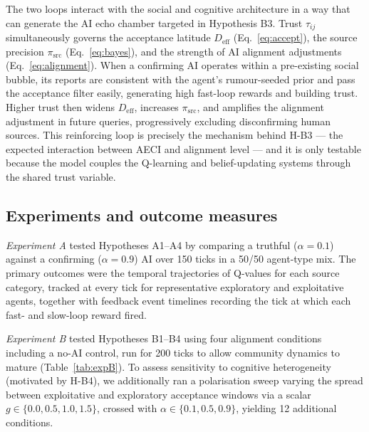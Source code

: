 \documentclass[pdflatex,sn-apa]{sn-jnl}%
\begin{document}
The two loops interact with the social and cognitive architecture
in a way that can generate the AI echo chamber targeted in
Hypothesis B3.
Trust $\tau_{ij}$ simultaneously governs the acceptance latitude
$D_\mathrm{eff}$ (Eq.~\ref{eq:accept}), the source precision
$\pi_\mathrm{src}$ (Eq.~\ref{eq:bayes}), and the strength of AI
alignment adjustments (Eq.~\ref{eq:alignment}).
When a confirming AI operates within a pre-existing social bubble,
its reports are consistent with the agent's rumour-seeded prior
and pass the acceptance filter easily, generating high fast-loop
rewards and building trust.
Higher trust then widens $D_\mathrm{eff}$, increases
$\pi_\mathrm{src}$, and amplifies the alignment adjustment in
future queries, progressively excluding disconfirming human sources.
This reinforcing loop is precisely the mechanism behind H-B3 ---
the expected interaction between AECI and alignment level --- and
it is only testable because the model couples the Q-learning and
belief-updating systems through the shared trust variable.

\subsection*{Experiments and outcome measures}

\emph{Experiment A} tested Hypotheses A1--A4 by comparing a
truthful ($\alpha=0.1$) against a confirming ($\alpha=0.9$) AI
over 150 ticks in a 50/50 agent-type mix.
The primary outcomes were the temporal trajectories of Q-values
for each source category, tracked at every tick for representative
exploratory and exploitative agents, together with feedback event
timelines recording the tick at which each fast- and slow-loop
reward fired.

\emph{Experiment B} tested Hypotheses B1--B4 using four alignment
conditions including a no-AI control, run for 200 ticks to allow
community dynamics to mature (Table~\ref{tab:expB}).
To assess sensitivity to cognitive heterogeneity (motivated by H-B4),
we additionally ran a polarisation sweep varying the spread between
exploitative and exploratory acceptance windows via a scalar
$g\in\{0.0,0.5,1.0,1.5\}$, crossed with
$\alpha\in\{0.1,0.5,0.9\}$, yielding 12 additional conditions.
\end{document}
